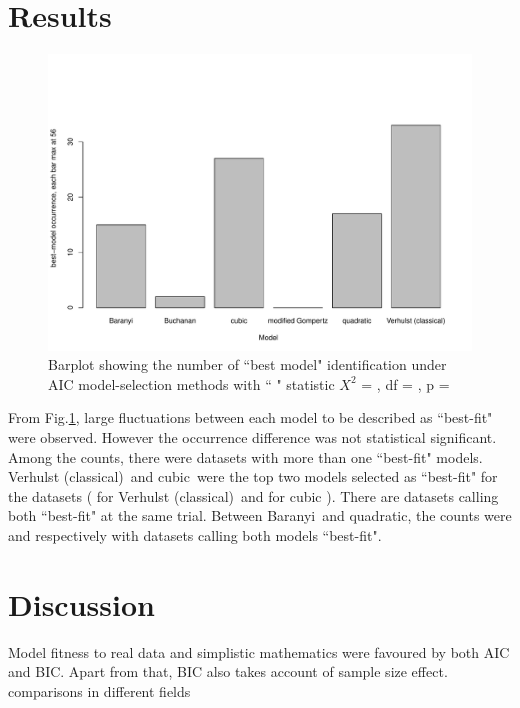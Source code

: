 \documentclass[a4paper, 11pt]{article}
\newcommand{\fve}{Verhulst (classical)}
\newcommand{\fba}{Baranyi}
\newcommand{\fqu}{quadratic}
\newcommand{\fcu}{cubic}
\begin{document}
	\section*{Results}
	\begin{figure}[h]
		\includegraphics[width=\linewidth]{../results/barplot_BestModel.pdf}
		\caption{Barplot showing the number of ``best model" identification under AIC model-selection methods with ``
			" statistic $X^{2}$ = 
			, df = 
			, p = 
		}\label{barPT}
	\end{figure}
	From Fig.\ref{barPT}, large fluctuations between each model to be described as ``best-fit" were observed.  However the occurrence difference was not statistical significant.  Among the counts, there were 
	datasets with more than one ``best-fit" models.  \fve\ and \fcu\ were the top two models selected as ``best-fit" for the 
	 datasets (
	  for \fve\ and 
	  for \fcu
	 ).  There are 
	  datasets calling both ``best-fit" at the same trial.  Between \fba\ and \fqu, the counts were 
	  and 
	  respectively with 
	 datasets calling both models ``best-fit".
	
	\section*{Discussion}
	Model fitness to real data and simplistic mathematics were favoured by both AIC\autocite{johnson2004model,akaike1998information,burnhamdr} and BIC\autocite{johnson2004model,turchin2003complex}.  Apart from that, BIC also takes account of sample size effect\autocite{johnson2004model,turchin2003complex}.\\
	comparisons in different fields\autocite{kuha2004aic,aho2014model,yang2005can,vrieze2012model,wang2006comparison,acquah2010comparison}
	
\end{document}
